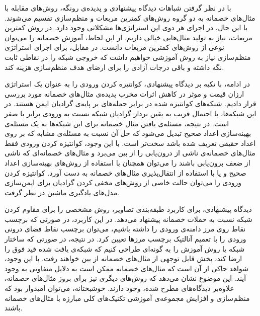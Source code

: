 \documentclass[12pt,onecolumn,a4paper]{article}
\begin{document}
با در نظر گرفتن شباهات دیدگاه پیشنهادی و پدیده‌ی رونگه، روش‌های مقابله با مثال‌های خصمانه به دو گروه روش‌های کمترین مربعات و منظم‌سازی تقسیم می‌شوند. با این حال، در اجرای هر دوی این استراتژی‌ها مشکلاتی وجود دارد. در روش کمترین مربعات، نیاز به تولید مثال‌هایی خیالی داریم. از این لحاظ، آموزش خصمانه را می‌توان نوعی از روش‌های کمترین مربعات دانست. در مقابل، برای اجرای استراتژی منظم‌سازی نیاز به روش آموزشی خواهیم داشت که خروجی شبکه را در نقاطی ثابت نگه داشته و باقی درجات آزادی را برای ارضای هدف منظم‌سازی هزینه کند.

در ادامه، با تکیه بر دیدگاه پیشنهادی، کوانتیزه کردن ورودی را به عنوان یک استراتژی ارزان قیمت و موثر در کاهش اثرات مخرب پدیده‌ی مثال‌های خصمانه مورد بررسی قرار دادیم. شبکه‌های کوانتیزه شده در برابر حمله‌های بر پایه‌ی گرادیان ایمن هستند. در این شبکه‌ها، با احتمال قریب به یقین بردار گرادیان شبکه نسبت به ورودی برابر با صفر است. در نتیجه، مسئله‌ی یافتن مثال خصمانه برای این شبکه‌ها به یک مسئله‌ی بهینه‌سازی اعداد صحیح تبدیل می‌شود که حل آن نسبت به مسئله‌ی مشابه که بر روی اعداد حقیقی تعریف شده باشد سخت‌تر است. با این وجود، کوانتیزه کردن ورودی فقط مثال‌های خصمانه‌ی ناشی از درون‌یابی را از بین می‌برد و مثال‌های خصمانه‌ای که ناشی از ضعف برون‌یابی باشند را می‌توان همچنان با استفاده از روش‌های بهینه‌سازی اعداد صحیح و یا با استفاده از انتقال‌پذیری مثال‌های خصمانه به دست آورد. کوانتیزه کردن ورودی را می‌توان حالت خاصی از روش‌های مخفی کردن گرادیان برای ایمن‌سازی مدل‌های یادگیری ماشین در نظر گرفت.

دیدگاه پیشنهادی، برای کاربرد طبقه‌بندی تصاویر، روش مشخصی را برای مقاوم کردن شبکه نسبت به حملات خصمانه پیشنهاد می‌دهد. در این کاربرد، در صورتی که برچسب نقاط روی مرز دامنه‌ی ورودی را داشته باشیم، می‌توان برچسب نقاط فضای درونی ورودی را با تعمیم آنالتیک برچسب مرزها تعیین کرد. در نتیجه، در صورتی که ساختار شبکه یا روش آموزش را به گونه‌ای طراحی کنیم که شبکه‌ی یافت شده قید فوق را ارضا کند، بخش قابل توجهی از مثال‌های خصمانه از بین خواهند رفت. با این وجود، شواهد حاکی از آن است که مثال‌های خصمانه ممکن است به دلایل متفاوتی به وجود آیند. این موضوع نشان می‌دهد که روش‌های دیگری نیز برای بروز مثال‌های خصمانه، علاوه‌بر دیدگاه‌های مطرح شده، وجود دارند. خوشبختانه، می‌توان امیدوار بود که منظم‌سازی و افزایش مجموعه‌ی آموزشی تکنیک‌های کلی مبارزه با مثال‌های خصمانه باشند.

\setLTRbibitems


\end{document}
